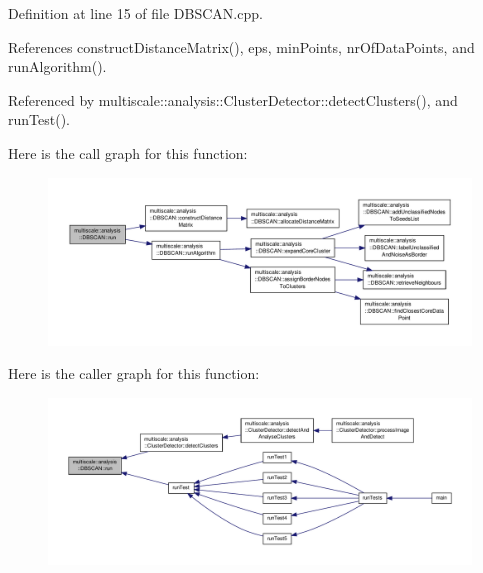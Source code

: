 Definition at line 15 of file D\-B\-S\-C\-A\-N.\-cpp.



References construct\-Distance\-Matrix(), eps, min\-Points, nr\-Of\-Data\-Points, and run\-Algorithm().



Referenced by multiscale\-::analysis\-::\-Cluster\-Detector\-::detect\-Clusters(), and run\-Test().



Here is the call graph for this function\-:
\nopagebreak
\begin{figure}[H]
\begin{center}
\leavevmode
\includegraphics[width=350pt]{classmultiscale_1_1analysis_1_1DBSCAN_a52f0eb2d04029c75a3c48a37efdac26b_cgraph}
\end{center}
\end{figure}




Here is the caller graph for this function\-:
\nopagebreak
\begin{figure}[H]
\begin{center}
\leavevmode
\includegraphics[width=350pt]{classmultiscale_1_1analysis_1_1DBSCAN_a52f0eb2d04029c75a3c48a37efdac26b_icgraph}
\end{center}
\end{figure}


